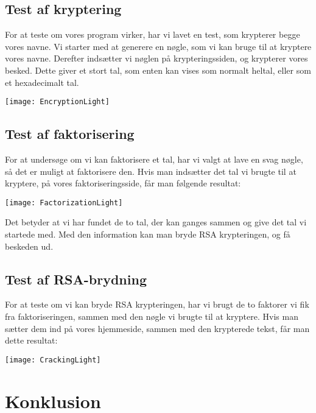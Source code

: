 \documentclass[a4paper,12pt]{extarticle}
\begin{document}
    \subsection{Test af kryptering}\label{subsec:testing-encryption}
    For at teste om vores program virker, har vi lavet en test, som krypterer begge vores navne.
    Vi starter med at generere en nøgle, som vi kan bruge til at kryptere vores navne.
    Derefter indsætter vi nøglen på krypteringssiden, og krypterer vores besked.
    Dette giver et stort tal, som enten kan vises som normalt heltal, eller som et hexadecimalt tal.

    \texttt{[image: EncryptionLight]}\label{img:encryption}  %

    \subsection{Test af faktorisering}\label{subsec:testing-factorization}
    For at undersøge om vi kan faktorisere et tal, har vi valgt at lave en svag nøgle,
    så det er muligt at faktorisere den.
    Hvis man indsætter det tal vi brugte til at kryptere, på vores faktoriseringsside, får man følgende resultat:

    \texttt{[image: FactorizationLight]}\label{img:factorization}  %

    Det betyder at vi har fundet de to tal, der kan ganges sammen og give det tal vi startede med.
    Med den information kan man bryde RSA krypteringen, og få beskeden ud.

    \subsection{Test af RSA-brydning}\label{subsec:testing-cracking}
    For at teste om vi kan bryde RSA krypteringen, har vi brugt de to faktorer vi fik fra faktoriseringen,
    sammen med den nøgle vi brugte til at kryptere.
    Hvis man sætter dem ind på vores hjemmeside, sammen med den krypterede tekst, får man dette resultat:

    \texttt{[image: CrackingLight]}\label{img:cracking}  %

    \section{Konklusion}\label{sec:konklusion}
\end{document}
